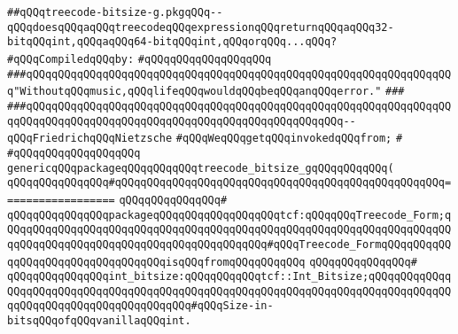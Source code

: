 \label{src/lib/compiler/back/low/treecode/treecode-bitsize-g.pkg}
\verb|##qQQqtreecode-bitsize-g.pkgqQQq--qQQqdoesqQQqaqQQqtreecodeqQQqexpressionqQQqreturnqQQqaqQQq32-bitqQQqint,qQQqaqQQq64-bitqQQqint,qQQqorqQQq...qQQq?|\newline
\newline
\verb|#qQQqCompiledqQQqby:|\newline
\verb|#qQQqqQQqqQQqqQQqqQQq|\newline
\newline
\newline
\newline
\verb|###qQQqqQQqqQQqqQQqqQQqqQQqqQQqqQQqqQQqqQQqqQQqqQQqqQQqqQQqqQQqqQQqqQQq"WithoutqQQqmusic,qQQqlifeqQQqwouldqQQqbeqQQqanqQQqerror."|\newline
\verb|###|\newline
\verb|###qQQqqQQqqQQqqQQqqQQqqQQqqQQqqQQqqQQqqQQqqQQqqQQqqQQqqQQqqQQqqQQqqQQqqQQqqQQqqQQqqQQqqQQqqQQqqQQqqQQqqQQqqQQqqQQqqQQqqQQq--qQQqFriedrichqQQqNietzsche|\newline
\newline
\newline
\verb|#qQQqWeqQQqgetqQQqinvokedqQQqfrom;|\newline
\verb|#|\newline
\verb|#qQQqqQQqqQQqqQQqqQQq|\newline
\newline
\verb|genericqQQqpackageqQQqqQQqqQQqtreecode_bitsize_gqQQqqQQqqQQq(|\newline
\verb|qQQqqQQqqQQqqQQq#qQQqqQQqqQQqqQQqqQQqqQQqqQQqqQQqqQQqqQQqqQQqqQQqqQQq==================|\newline
\verb|qQQqqQQqqQQqqQQq#|\newline
\verb|qQQqqQQqqQQqqQQqpackageqQQqqQQqqQQqqQQqqQQqtcf:qQQqqQQqTreecode_Form;qQQqqQQqqQQqqQQqqQQqqQQqqQQqqQQqqQQqqQQqqQQqqQQqqQQqqQQqqQQqqQQqqQQqqQQqqQQqqQQqqQQqqQQqqQQqqQQqqQQqqQQqqQQqqQQq#qQQqTreecode_FormqQQqqQQqqQQqqQQqqQQqqQQqqQQqqQQqqQQqisqQQqfromqQQqqQQqqQQq|\newline
\verb|qQQqqQQqqQQqqQQq#|\newline
\verb|qQQqqQQqqQQqqQQqint_bitsize:qQQqqQQqqQQqtcf::Int_Bitsize;qQQqqQQqqQQqqQQqqQQqqQQqqQQqqQQqqQQqqQQqqQQqqQQqqQQqqQQqqQQqqQQqqQQqqQQqqQQqqQQqqQQqqQQqqQQqqQQqqQQqqQQqqQQqqQQq#qQQqSize-in-bitsqQQqofqQQqvanillaqQQqint.|\newline
